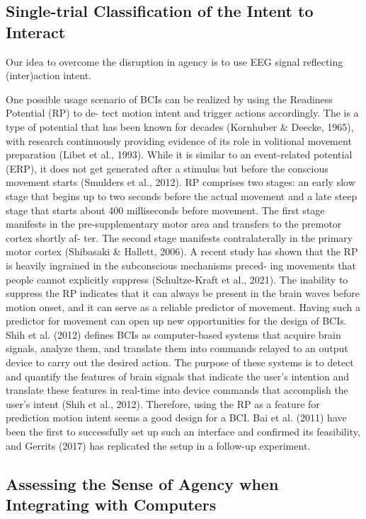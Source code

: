 \subsection{Single-trial Classification of the Intent to Interact}

Our idea to overcome the disruption in agency is to use EEG signal reflecting (inter)action intent.

One possible usage scenario of BCIs can be realized by using the Readiness Potential (RP) to de- tect motion intent and trigger actions accordingly. The is a type of potential that has been known for decades (Kornhuber & Deecke, 1965), with research continuously providing evidence of its role in volitional movement preparation (Libet et al., 1993). While it is similar to an event-related potential (ERP), it does not get generated after a stimulus but before the conscious movement starts (Smulders et al., 2012). RP comprises two stages: an early slow stage that begins up to two seconds before the actual movement and a late steep stage that starts about 400 milliseconds before movement. The first stage manifests in the pre-supplementary motor area and transfers to the premotor cortex shortly af- ter. The second stage manifests contralaterally in the primary motor cortex (Shibasaki & Hallett, 2006).
A recent study has shown that the RP is heavily ingrained in the subconscious mechanisms preced- ing movements that people cannot explicitly suppress (Schultze-Kraft et al., 2021). The inability to suppress the RP indicates that it can always be present in the brain waves before motion onset, and it can serve as a reliable predictor of movement.
Having such a predictor for movement can open up new opportunities for the design of BCIs. Shih et al. (2012) defines BCIs as computer-based systems that acquire brain signals, analyze them, and translate them into commands relayed to an output device to carry out the desired action. The purpose of these systems is to detect and quantify the features of brain signals that indicate the user’s intention and translate these features in real-time into device commands that accomplish the user’s intent (Shih et al., 2012). Therefore, using the RP as a feature for prediction motion intent seems a good design for a BCI. Bai et al. (2011) have been the first to successfully set up such an interface and confirmed its feasibility, and Gerrits (2017) has replicated the setup in a follow-up experiment.

\subsection{Assessing the Sense of Agency when Integrating with Computers}